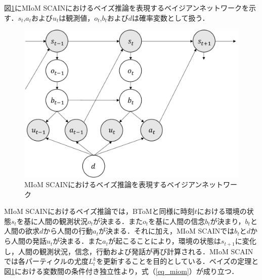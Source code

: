 \par
図\ref{fig:miom}にMIoM SCAINにおけるベイズ推論を表現するベイジアンネットワークを示す．$s_t$,$a_t$および$u_t$は観測値，$o_t$,$b_t$および$d$は確率変数として扱う．
\begin{figure}[htbp]
  \begin{center}
    \includegraphics[scale=0.7]{./miom.pdf}
    \caption{MIoM SCAINにおけるベイズ推論を表現するベイジアンネットワーク}
    \label{fig:miom}
  \end{center}
\end{figure}
MIoM SCAINにおけるベイズ推論では，BToMと同様に時刻$t$における環境の状態$s_{t}$を基に人間の観測状況$o_{t}$が決まる．また$o_{t}$を基に人間の信念$b_{t}$が決まり，$b_{t}$と人間の欲求$d$から人間の行動$a_{t}$が決まる．それに加え，MIoM SCAINでは$b_t$と$d$から人間の発話$u_t$が決まる．また$a_{t}$が起こることにより，環境の状態は$s_{t+1}$に変化し，人間の観測状況，信念，行動および発話が再び計算される．MIoM SCAINでは各パーティクルの尤度$L^k_t$を更新することを目的としている．ベイズの定理と図\ref{fig:miom}における変数間の条件付き独立性より，式（\ref{eq_miom}）が成り立つ．

